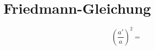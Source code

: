 \chapter{Friedmann-Gleichung\label{chapter:thema}}
\begin{refsection}
\printbibliography[heading=subbibliography]
\begin{equation}
\left(\frac{a'}{a}\right) ^ 2 = 
\end{equation}
\end{refsection}

